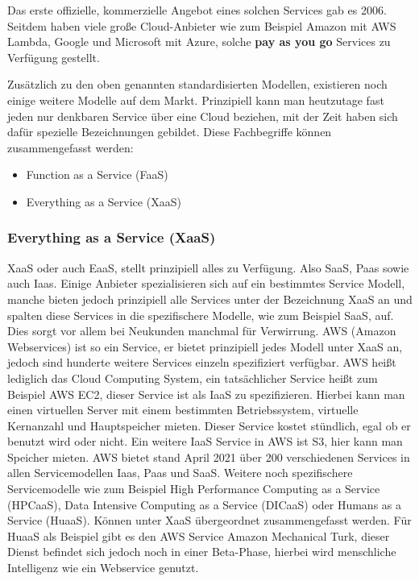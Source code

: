 Das erste offizielle, kommerzielle Angebot eines solchen Services gab es 2006. Seitdem haben viele große Cloud-Anbieter wie zum Beispiel Amazon mit AWS Lambda, Google und Microsoft mit Azure, solche \textbf{pay as you go} Services zu Verfügung gestellt.


Zusätzlich zu den oben genannten standardisierten Modellen, existieren noch einige weitere Modelle auf dem Markt. Prinzipiell
kann man heutzutage fast jeden nur denkbaren Service über eine Cloud beziehen, mit der Zeit haben sich dafür spezielle Bezeichnungen gebildet. Diese Fachbegriffe können zusammengefasst werden:
\begin{itemize}
	\item Function as a Service (FaaS)
	\item Everything as a Service (XaaS)

\end{itemize}


\subsubsection{Everything as a Service (XaaS)}
XaaS oder auch EaaS, stellt prinzipiell alles zu Verfügung. Also SaaS, Paas sowie auch Iaas. Einige Anbieter spezialisieren sich auf ein bestimmtes Service Modell, manche bieten jedoch prinzipiell alle Services unter der Bezeichnung XaaS an und spalten diese Services in die spezifischere Modelle, wie zum Beispiel SaaS, auf. Dies sorgt vor allem bei Neukunden manchmal für Verwirrung. AWS (Amazon Webservices) ist so ein Service, er bietet prinzipiell jedes Modell unter XaaS an, jedoch sind hunderte weitere Services einzeln spezifiziert verfügbar. AWS heißt lediglich das Cloud Computing System, ein tatsächlicher Service heißt zum Beispiel AWS EC2, dieser Service ist als IaaS zu spezifizieren. Hierbei kann man einen virtuellen Server mit einem bestimmten Betriebssystem, virtuelle Kernanzahl und Hauptspeicher mieten. Dieser Service kostet stündlich, egal ob er benutzt wird oder nicht. Ein weitere IaaS Service in AWS ist S3, hier kann man Speicher mieten.\newline
AWS bietet stand April 2021 über 200 verschiedenen Services in allen Servicemodellen Iaas, Paas und SaaS.
\newline
Weitere noch spezifischere Servicemodelle wie zum Beispiel High Performance Computing as a Service (HPCaaS), Data Intensive Computing as a Service (DICaaS) oder Humans as a Service (HuaaS). Können unter XaaS übergeordnet zusammengefasst werden. Für HuaaS als Beispiel gibt es den AWS Service Amazon Mechanical Turk, dieser Dienst befindet sich jedoch noch in einer Beta-Phase, hierbei wird menschliche Intelligenz wie ein Webservice genutzt.

